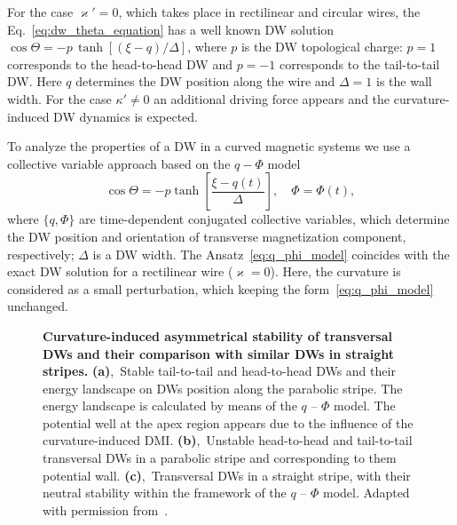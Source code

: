 For the case $\varkappa' = 0$, which takes place in rectilinear and circular wires, the Eq.~\eqref{eq:dw_theta_equation} has a well known DW solution $\cos \Theta = - p \, \tanh[(\xi-q)/\Delta]$, where $p$ is the DW topological charge: $p=1$ corresponds to the head-to-head DW and $p=-1$ corresponds to the tail-to-tail DW. Here $q$ determines the DW position along the wire and $\Delta = 1$ is the wall width. For the case $\kappa' \neq 0$ an additional driving force appears and the curvature-induced DW dynamics is expected. 

To analyze the properties of a DW in a curved magnetic systems we use a collective variable approach based on the $q-\varPhi$ model~\cite{Slonczewski72,Malozemoff79}
\begin{equation}\label{eq:q_phi_model}
\cos\Theta=-p\tanh\left[\frac{\xi-q(t)}{\Delta}\right],\quad\Phi=\varPhi(t),
\end{equation}
where $\{q, \varPhi\}$ are time-dependent conjugated collective variables, which determine the DW position and orientation of transverse magnetization component, respectively; $\Delta$ is a DW width. The Ansatz~\eqref{eq:q_phi_model} coincides with the exact DW solution for a rectilinear wire ($\varkappa=0$). Here, the curvature is considered as a small perturbation, which keeping the form~\eqref{eq:q_phi_model} unchanged. %

\begin{figure}[t]
	\caption{\textbf{Curvature-induced asymmetrical stability of transversal DWs and their comparison with similar DWs in straight stripes.} \textbf{(a)},~Stable tail-to-tail and head-to-head DWs and their energy landscape on DWs position along the parabolic stripe. The energy landscape is calculated by means of the $q$ -- $\Phi$ model. The potential well at the apex region appears due to the influence of the curvature-induced DMI. \textbf{(b)},~Unstable head-to-head and tail-to-tail transversal DWs in a parabolic stripe and corresponding to them potential wall. \textbf{(c)},~Transversal DWs in a straight stripe, with their neutral stability within the framework of the $q$ -- $\Phi$ model. Adapted with permission from~\cite{Volkov19c}.}
	\label{fig:Parabola_n_straight_DWs}
\end{figure}

